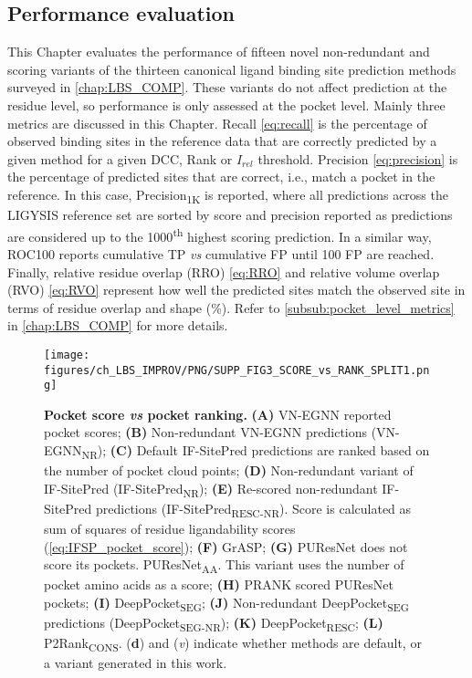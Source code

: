 \subsection{Performance evaluation}

This Chapter evaluates the performance of fifteen novel non-redundant and scoring variants of the thirteen canonical ligand binding site prediction methods surveyed in \autoref{chap:LBS_COMP}. These variants do not affect prediction at the residue level, so performance is only assessed at the pocket level. Mainly three metrics are discussed in this Chapter. Recall \autoref{eq:recall} is the percentage of observed binding sites in the reference data that are correctly predicted by a given method for a given DCC, Rank or $I_{rel}$ threshold. Precision \autoref{eq:precision} is the percentage of predicted sites that are correct, i.e., match a pocket in the reference. In this case, Precision\textsubscript{1K} is reported, where all predictions across the LIGYSIS reference set are sorted by score and precision reported as predictions are considered up to the 1000\textsuperscript{th} highest scoring prediction. In a similar way, ROC100 \cite{WEBBER_2003_ROC100} reports cumulative TP \textit{vs} cumulative FP until 100 FP are reached. Finally, relative residue overlap (RRO) \autoref{eq:RRO} and relative volume overlap (RVO) \autoref{eq:RVO} represent how well the predicted sites match the observed site in terms of residue overlap and shape (\%). Refer to \autoref{subsub:pocket_level_metrics} in \autoref{chap:LBS_COMP} for more details.

\FloatBarrier

\begin{figure}[htb!]
    \centering
    \texttt{[image: figures/ch\_LBS\_IMPROV/PNG/SUPP\_FIG3\_SCORE\_vs\_RANK\_SPLIT1.png]}
    \caption[Pocket score \textit{vs} pocket ranking]{\textbf{Pocket score \textit{vs} pocket ranking.} \textbf{(A)} VN-EGNN reported pocket scores; \textbf{(B)} Non-redundant VN-EGNN predictions (VN-EGNN\textsubscript{NR}); \textbf{(C)} Default IF-SitePred predictions are ranked based on the number of pocket cloud points; \textbf{(D)} Non-redundant variant of IF-SitePred (IF-SitePred\textsubscript{NR}); \textbf{(E)} Re-scored non-redundant IF-SitePred predictions (IF-SitePred\textsubscript{RESC-NR}). Score is calculated as sum of squares of residue ligandability scores (\autoref{eq:IFSP_pocket_score}); \textbf{(F)} GrASP; \textbf{(G)} PUResNet does not score its pockets. PUResNet\textsubscript{AA}. This variant uses the number of pocket amino acids as a score; \textbf{(H)} PRANK scored PUResNet pockets; \textbf{(I)} DeepPocket\textsubscript{SEG}; \textbf{(J)} Non-redundant DeepPocket\textsubscript{SEG} predictions (DeepPocket\textsubscript{SEG-NR}); \textbf{(K)} DeepPocket\textsubscript{RESC}; \textbf{(L)} P2Rank\textsubscript{CONS}. (\textbf{d}) and (\textit{v}) indicate whether methods are default, or a variant generated in this work.}
    \label{fig:pocket_score_vs_rank1}
\end{figure}

